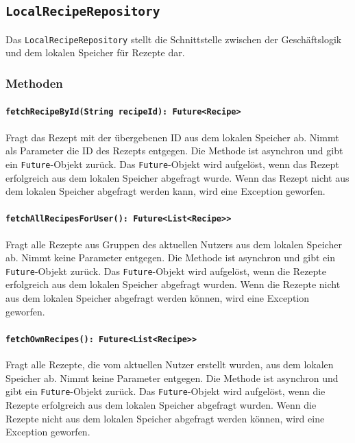 \documentclass[parskip=full]{scrartcl}
\begin{document}
\subsection{\texttt{LocalRecipeRepository}}
Das \texttt{LocalRecipeRepository} stellt die Schnittstelle zwischen der Geschäftslogik und dem lokalen Speicher für Rezepte dar.
\subsubsection*{Methoden}
\paragraph{\texttt{fetchRecipeById(String recipeId): Future<Recipe>}}
Fragt das Rezept mit der übergebenen ID aus dem lokalen Speicher ab. Nimmt als Parameter die ID des Rezepts entgegen. Die Methode ist asynchron und gibt ein \texttt{Future}-Objekt zurück. Das \texttt{Future}-Objekt wird aufgelöst, wenn das Rezept erfolgreich aus dem lokalen Speicher abgefragt wurde. Wenn das Rezept nicht aus dem lokalen Speicher abgefragt werden kann, wird eine Exception geworfen.
\paragraph{\texttt{fetchAllRecipesForUser(): Future<List<Recipe>>}}
Fragt alle Rezepte aus Gruppen des aktuellen Nutzers aus dem lokalen Speicher ab. Nimmt keine Parameter entgegen. Die Methode ist asynchron und gibt ein \texttt{Future}-Objekt zurück. Das \texttt{Future}-Objekt wird aufgelöst, wenn die Rezepte erfolgreich aus dem lokalen Speicher abgefragt wurden. Wenn die Rezepte nicht aus dem lokalen Speicher abgefragt werden können, wird eine Exception geworfen.
\paragraph{\texttt{fetchOwnRecipes(): Future<List<Recipe>>}}
Fragt alle Rezepte, die vom aktuellen Nutzer erstellt wurden, aus dem lokalen Speicher ab. Nimmt keine Parameter entgegen. Die Methode ist asynchron und gibt ein \texttt{Future}-Objekt zurück. Das \texttt{Future}-Objekt wird aufgelöst, wenn die Rezepte erfolgreich aus dem lokalen Speicher abgefragt wurden. Wenn die Rezepte nicht aus dem lokalen Speicher abgefragt werden können, wird eine Exception geworfen.
\newpage
\end{document}
